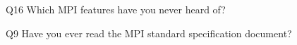 \begin{description}%
\item{Q16} Which MPI features have you never heard of?%
\item{Q9} Have you ever read the MPI standard specification document?%
\end{description}%
